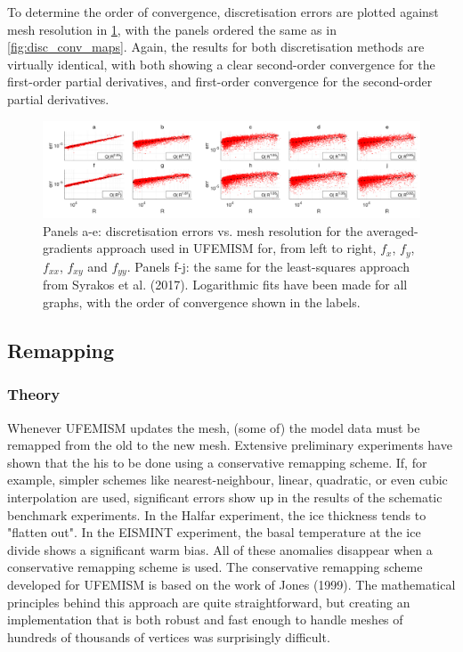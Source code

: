 \documentclass{article}
\begin{document}
To determine the order of convergence, discretisation errors are plotted against mesh resolution in \ref{fig:disc_conv_order}, with the panels ordered the same as in \ref{fig:disc_conv_maps}. Again, the results for both discretisation methods are virtually identical, with both showing a clear second-order convergence for the first-order partial derivatives, and first-order convergence for the second-order partial derivatives.

\begin{figure}[h!] \label{fig:disc_conv_order}
  \includegraphics[width=0.9\linewidth]{Fig_discretisation_convergence_order.png}
  \caption{Panels a-e: discretisation errors vs. mesh resolution for the averaged-gradients approach used in UFEMISM for, from left to right, $f_x$, $f_y$, $f_{xx}$, $f_{xy}$ and $f_{yy}$. Panels f-j: the same for the least-squares approach from Syrakos et al. (2017). Logarithmic fits have been made for all graphs, with the order of convergence shown in the labels.}
\end{figure}


\subsection{Remapping}

\subsubsection{Theory}

Whenever UFEMISM updates the mesh, (some of) the model data must be remapped from the old to the new mesh. Extensive preliminary experiments have shown that the his to be done using a conservative remapping scheme. If, for example, simpler schemes like nearest-neighbour, linear, quadratic, or even cubic interpolation are used, significant errors show up in the results of the schematic benchmark experiments. In the Halfar experiment, the ice thickness tends to "flatten out". In the EISMINT experiment, the basal temperature at the ice divide shows a significant warm bias. All of these anomalies disappear when a conservative remapping scheme is used. The conservative remapping scheme developed for UFEMISM is based on the work of Jones (1999). The mathematical principles behind this approach are quite straightforward, but creating an implementation that is both robust and fast enough to handle meshes of hundreds of thousands of vertices was surprisingly difficult.
\end{document}
